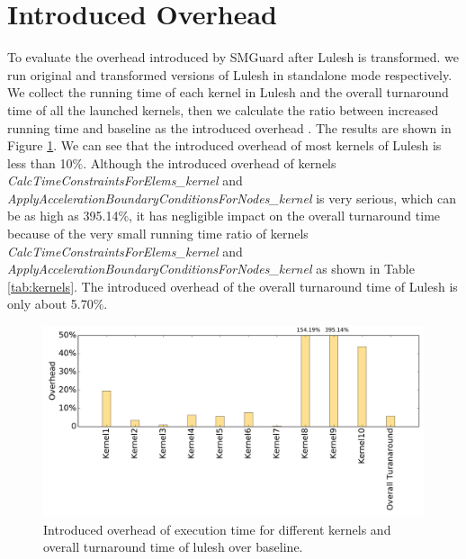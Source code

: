 \documentclass[a4paper,9pt]{article}
\begin{document}
\section{Introduced Overhead}
To evaluate the overhead introduced by SMGuard after Lulesh is transformed. we run original and transformed 
versions of Lulesh in standalone mode respectively. We collect the running time of each kernel in Lulesh and 
the overall turnaround time of all the launched kernels, then we calculate the ratio between increased running 
time and baseline as the introduced overhead . The results are shown in Figure \ref{fig:introduced_overhead}. 
We can see that the introduced overhead of most kernels of Lulesh is less than 10\%. Although the introduced 
overhead of kernels \emph{CalcTimeConstraintsForElems\_kernel} and \emph{ApplyAccelerationBoundaryConditionsForNodes\_kernel} 
is very serious, which can be as high as 395.14\%, it has negligible impact on the overall turnaround time 
because of the very small running time ratio of kernels \emph{CalcTimeConstraintsForElems\_kernel} and \emph{ApplyAccelerationBoundaryConditionsForNodes\_kernel} as shown in Table \ref{tab:kernels}. The 
introduced overhead of the overall turnaround time of Lulesh is only about 5.70\%.

\begin{figure}[!t]
	\centering
	\includegraphics[width=6.5in]{fig/lulesh_introduced_overhead.pdf}
	\caption{Introduced overhead of execution time for different kernels and overall turnaround time of 
		lulesh over baseline.}
	\label{fig:introduced_overhead}
\end{figure}
    
\end{document}
